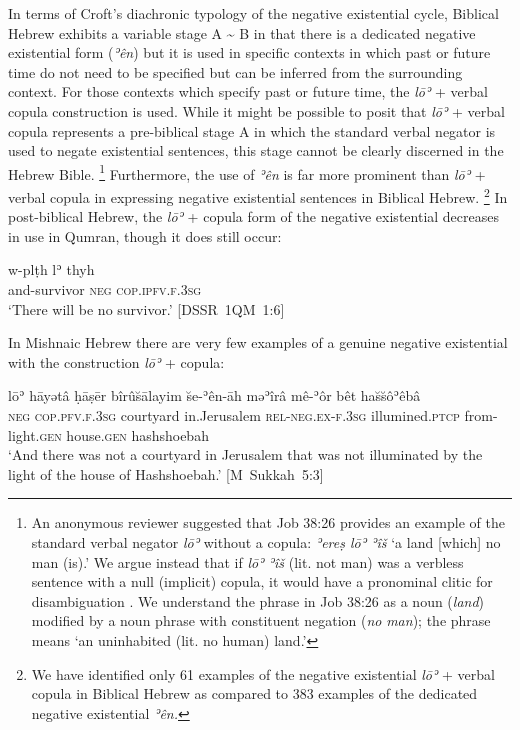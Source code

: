 \documentclass[output=paper,colorlinks,citecolor=brown,draft,draftmode]{langscibook}
\begin{document}
In terms of Croft's diachronic typology of the negative existential cycle,
Biblical Hebrew exhibits a variable stage A {\textasciitilde} B in that
there is a dedicated negative existential form (\textit{ʾên}) but it is
used in specific contexts in which past or future time do not need to be
specified but can be inferred from the surrounding context. For those
contexts which specify past or future time, the \textit{lōʾ} + verbal
copula construction is used. While it might be possible to posit that
\textit{lōʾ} + verbal copula represents a pre-biblical stage A in which the
standard verbal negator is used to negate existential sentences, this stage
cannot be clearly discerned in the Hebrew Bible.%
%
    \footnote{An anonymous reviewer suggested that Job 38:26 provides an
    example of the standard verbal negator \textit{lōʾ} without a copula:
    \textit{ʾereṣ lōʾ ʾîš} `a land [which] no man (is).' We argue instead
    that if \textit{lōʾ ʾîš} (lit. not man) was a verbless sentence with a
    null (implicit) copula, it would have a pronominal clitic for
    disambiguation  \parencite[see][]{Naude1996}.  We understand the phrase
    in Job 38:26 as a noun (\textit{land}) modified by a noun phrase with
    constituent negation (\textit{no} \textit{man}); the phrase means `an
    uninhabited (lit.  no human) land.'} %
%
Furthermore, the use of \textit{ʾên} is far more
prominent than \textit{lōʾ}  + verbal copula in expressing negative
existential sentences in Biblical Hebrew.%
%
    \footnote{We have identified only
    61 examples of the negative existential \textit{lōʾ} + verbal copula in
    Biblical Hebrew as compared to 383 examples of the dedicated negative
    existential \textit{ʾên.}} %
%
In post-biblical Hebrew, the \textit{lōʾ}  +
copula form of the negative existential decreases in use in Qumran, though
it does still occur:
%
\begin{exe}\ex \label{ex:heb-survivor}
    \gll w-plṭh lʾ thyh \\
and-survivor    \textsc{neg}    \textsc{cop.ipfv.f.3sg}  \\
    \glt
  `There will be no survivor.' \mbox{[DSSR 1QM 1:6]}
    \end{exe} 
%
\largerpage
In Mishnaic Hebrew there are very few examples of a genuine negative existential with the construction \textit{lōʾ}  + copula:
%
\begin{exe}\ex \label{ex:heb-Hashshoebah}
    \gll lōʾ   hāyətâ              ḥāṣēr bîrû\u{s}ālayim \u{s}e-ʾên-āh məʾîrâ mê-ʾôr  bêt ha\u{s}\u{s}ôʾêbâ\\
 \textsc{neg} \textsc{cop.pfv.f.3sg} courtyard in.Jerusalem  \textsc{rel}-\textsc{neg.ex}-\textsc{f.3sg}   illumined.\textsc{ptcp}   from-light.\textsc{gen} house.\textsc{gen}  hashshoebah \\
\glt `And there was not a courtyard in Jerusalem that was not illuminated
by the light of the house of Hashshoebah.' 
\mbox{[M Sukkah 5:3]}
    \end{exe}
\clearpage
\end{document}
